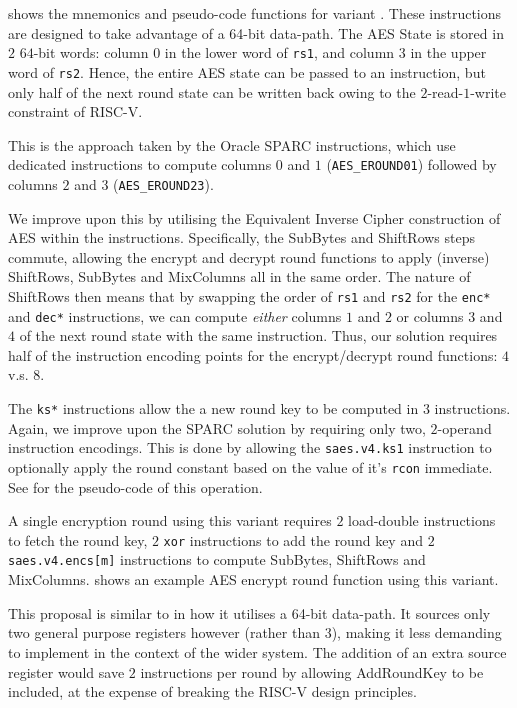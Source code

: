
 shows the mnemonics and pseudo-code functions
for variant .
These instructions are designed to take advantage of a 64-bit
data-path.
The AES State is stored in $2$ $64$-bit words: column $0$ in the
lower word of {\tt rs1}, and column $3$ in the upper word of {\tt rs2}.
Hence, the entire AES state can be passed to an instruction, but only
half of the next round state can be written back owing to the
$2$-read-$1$-write constraint of RISC-V.

This is the approach taken by the Oracle SPARC \cite[Page 109]{SPARC:16}
instructions, which use dedicated instructions to compute
columns $0$ and $1$ ({\tt AES\_EROUND01}) followed by
columns $2$ and $3$ ({\tt AES\_EROUND23}).

We improve upon this by utilising the Equivalent Inverse Cipher
construction of AES \cite[Section 5.4.4, Page 27]{FIPS:197} within
the instructions.
Specifically, the SubBytes and ShiftRows steps commute, allowing
the encrypt and decrypt round functions to apply (inverse)
ShiftRows, SubBytes and MixColumns all in the same order.
The nature of ShiftRows then means that by
swapping the order of {\tt rs1} and {\tt rs2}
for the {\tt enc*} and {\tt dec*} instructions, we can compute {\em either}
columns $1$ and $2$ or columns $3$ and $4$ of the next round state with the
same instruction.
Thus, our solution requires half of the instruction encoding points
for the encrypt/decrypt round functions: $4$ v.s. $8$.

The {\tt ks*} instructions allow the a new round key to be computed
in $3$ instructions.
Again, we improve upon the SPARC solution by requiring only two,
$2$-operand instruction encodings.
This is done by allowing the {\tt saes.v4.ks1} instruction
to optionally apply the round constant based on the value of
it's {\tt rcon} immediate.
See  for the pseudo-code of this
operation.

A single encryption round using this variant requires
$2$ load-double instructions to fetch the round key,
$2$ {\tt xor} instructions to add the round key
and
$2$ {\tt saes.v4.encs[m]} instructions to compute SubBytes, ShiftRows
and MixColumns.
 shows an example AES encrypt round function
using this variant.

This proposal is similar to \cite{SPARC:16} in how it utilises
a 64-bit data-path.
It sources only two general purpose registers however (rather than $3$),
making it less demanding to implement in the context of the wider
system.
The addition of an extra source register would save $2$ instructions
per round by allowing AddRoundKey to be included, at the expense
of breaking the RISC-V design principles.

